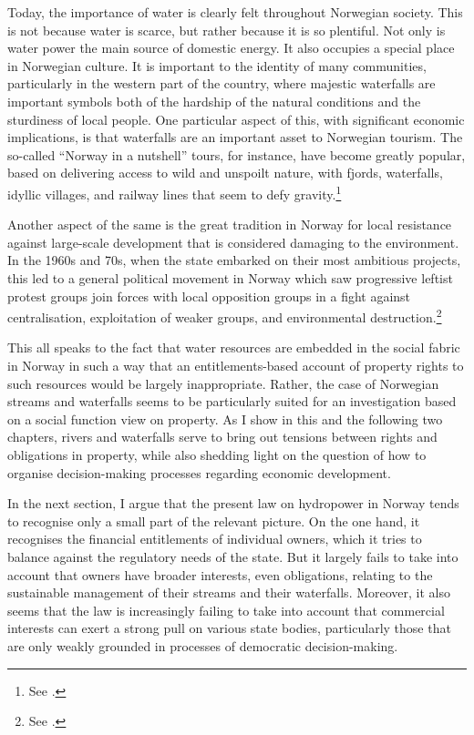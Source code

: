 Today, the importance of water is clearly felt throughout Norwegian society. This is not because water is scarce, but rather because it is so plentiful. Not only is water power the main source of domestic energy. It also occupies a special place in Norwegian culture. It is important to the identity of many communities, particularly in the western part of the country, where majestic waterfalls are important symbols both of the hardship of the natural conditions and the sturdiness of local people. One particular aspect of this, with significant economic implications, is that waterfalls are an important asset to Norwegian tourism. The so-called ``Norway in a nutshell'' tours, for instance, have become greatly popular, based on delivering access to wild and unspoilt nature, with fjords, waterfalls, idyllic villages, and railway lines that seem to defy gravity.\footnote{See \cite{nutshell}.}

Another aspect of the same is the great tradition in Norway for local resistance against large-scale development that is considered damaging to the environment. In the 1960s and 70s, when the state embarked on their most ambitious projects, this led to a general political movement in Norway which saw progressive leftist protest groups join forces with local opposition groups in a fight against centralisation, exploitation of weaker groups, and environmental destruction.\footnote{See \cite{....}.}

This all speaks to the fact that water resources are embedded in the social fabric in Norway in such a way that an entitlements-based account of property rights to such resources would be largely inappropriate. Rather, the case of Norwegian streams and waterfalls seems to be particularly suited for an investigation based on a social function view on property. As I show in this and the following two chapters, rivers and waterfalls serve to bring out tensions between rights and obligations in property, while also shedding light on the question of how to organise decision-making processes regarding economic development.

In the next section, I argue that the present law on hydropower in Norway tends to recognise only a small part of the relevant picture. On the one hand, it recognises the financial entitlements of individual owners, which it tries to balance against the regulatory needs of the state. But it largely fails to take into account that owners have broader interests, even obligations, relating to the sustainable management of their streams and their waterfalls. Moreover, it also seems that the law is increasingly failing to take into account that commercial interests can exert a strong pull on various state bodies, particularly those that are only weakly grounded in processes of democratic decision-making.

